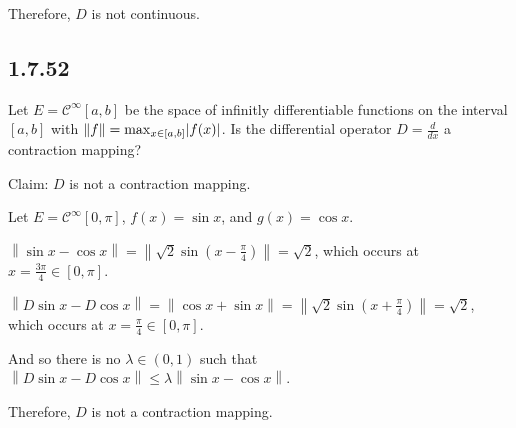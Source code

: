 \documentclass[letterpaper,12pt,fleqn]{article}
\newcommand{\mc}{\mathcal{C}}
\renewcommand{\l}{\lambda}
\newcommand{\norm}[1]{\left\|#1\right\|}
\begin{document}
Therefore, $D$ is not continuous.

\subsection*{1.7.52}

Let $E=\mc^{\infty}[a,b]$ be the space of infinitly differentiable functions on
the interval $[a,b]$ with $\norm{f}=\max_{x\in[a,b]}\abs{f(x)}$. Is the
differential operator $D=\frac{d}{dx}$ a contraction mapping?

Claim: $D$ is not a contraction mapping.

Let $E=\mc^{\infty}[0,\pi]$, $f(x)=\sin{x}$, and $g(x)=\cos{x}$.

$\norm{\sin{x}-\cos{x}}=\norm{\sqrt{2}\sin(x-\frac{\pi}{4})}=\sqrt{2}$,
which occurs at $x=\frac{3\pi}{4}\in[0,\pi]$.

$\norm{D\sin{x}-D\cos{x}}=\norm{\cos{x}+\sin{x}}=
\norm{\sqrt{2}\sin(x+\frac{\pi}{4})}=\sqrt{2}$,
which occurs at $x=\frac{\pi}{4}\in[0,\pi]$.

And so there is no $\l\in(0,1)$ such that
$\norm{D\sin{x}-D\cos{x}}\le\l\norm{\sin{x}-\cos{x}}$.

Therefore, $D$ is not a contraction mapping.
\end{document}
